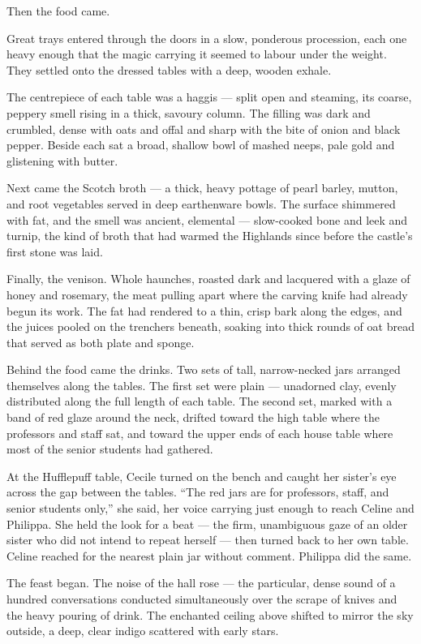 Then the food came.

Great trays entered through the doors in a slow, ponderous procession, each one heavy enough that the magic carrying it seemed to labour under the weight. They settled onto the dressed tables with a deep, wooden exhale.

The centrepiece of each table was a haggis --- split open and steaming, its coarse, peppery smell rising in a thick, savoury column. The filling was dark and crumbled, dense with oats and offal and sharp with the bite of onion and black pepper. Beside each sat a broad, shallow bowl of mashed neeps, pale gold and glistening with butter.

Next came the Scotch broth --- a thick, heavy pottage of pearl barley, mutton, and root vegetables served in deep earthenware bowls. The surface shimmered with fat, and the smell was ancient, elemental --- slow-cooked bone and leek and turnip, the kind of broth that had warmed the Highlands since before the castle's first stone was laid.

Finally, the venison. Whole haunches, roasted dark and lacquered with a glaze of honey and rosemary, the meat pulling apart where the carving knife had already begun its work. The fat had rendered to a thin, crisp bark along the edges, and the juices pooled on the trenchers beneath, soaking into thick rounds of oat bread that served as both plate and sponge.

Behind the food came the drinks. Two sets of tall, narrow-necked jars arranged themselves along the tables. The first set were plain --- unadorned clay, evenly distributed along the full length of each table. The second set, marked with a band of red glaze around the neck, drifted toward the high table where the professors and staff sat, and toward the upper ends of each house table where most of the senior students had gathered.

At the Hufflepuff table, Cecile turned on the bench and caught her sister's eye across the gap between the tables. \enquote{The red jars are for professors, staff, and senior students only,} she said, her voice carrying just enough to reach Celine and Philippa. She held the look for a beat --- the firm, unambiguous gaze of an older sister who did not intend to repeat herself --- then turned back to her own table. Celine reached for the nearest plain jar without comment. Philippa did the same.

The feast began. The noise of the hall rose --- the particular, dense sound of a hundred conversations conducted simultaneously over the scrape of knives and the heavy pouring of drink. The enchanted ceiling above shifted to mirror the sky outside, a deep, clear indigo scattered with early stars.

